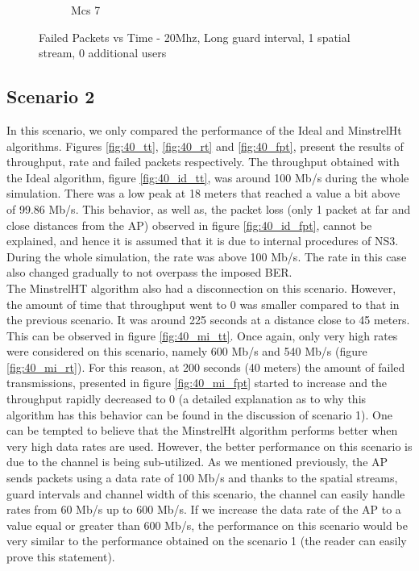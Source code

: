 \documentclass[12]{article}
\begin{document}
\begin{figure}[!htb]
\begin{subfigure}{.4\textwidth}
  \caption{Mcs 7}
  \label{fig:20_7_fpt}
\end{subfigure}
\caption{Failed Packets vs Time - 20Mhz, Long guard interval, 1 spatial stream, 0 additional users}
\label{fig:20_fpt}
\end{figure}



\newpage
\subsection{Scenario 2}
In this scenario, we only compared the performance of the Ideal and MinstrelHt algorithms. Figures \ref{fig:40_tt}, \ref{fig:40_rt} and \ref{fig:40_fpt}, present the results of throughput, rate and failed packets respectively. The throughput obtained with the Ideal algorithm, figure   \ref{fig:40_id_tt}, was around 100 Mb/s during the whole simulation. There was a low peak at 18 meters that reached a value a bit above of 99.86 Mb/s. This behavior, as well as, the packet loss (only 1 packet at far and close distances from the AP) observed in figure \ref{fig:40_id_fpt}, cannot be explained, and hence it is assumed that it is due to internal procedures of NS3. During the whole simulation, the rate was above 100 Mb/s. The rate in this case also changed gradually to not overpass the imposed BER.\\

The MinstrelHT algorithm also had a disconnection on this scenario. However, the amount of time that throughput went to 0 was smaller compared to that in the previous scenario. It was around 225 seconds at a distance close to 45 meters. This can be observed in figure \ref{fig:40_mi_tt}. Once again, only very high rates were considered on this scenario, namely 600 Mb/s and 540 Mb/s (figure \ref{fig:40_mi_rt}). For this reason, at 200 seconds (40 meters) the amount of failed transmissions, presented in figure \ref{fig:40_mi_fpt} started to increase and the throughput rapidly decreased to 0 (a detailed explanation as to why this algorithm has this behavior can be found in the discussion of scenario 1). One can be tempted to believe that the MinstrelHt algorithm performs better when very high data rates are used. However, the better performance on this scenario is due to the channel is being sub-utilized. As we mentioned previously, the AP sends packets using a data rate of 100 Mb/s and thanks to the spatial streams, guard intervals and channel width of this scenario, the channel can easily handle rates from 60 Mb/s up to 600 Mb/s. If we increase the data rate of the AP to a value equal or greater than 600 Mb/s, the performance on this scenario would be very similar to the performance obtained on the scenario 1 (the reader can easily prove this statement).
\end{document}
